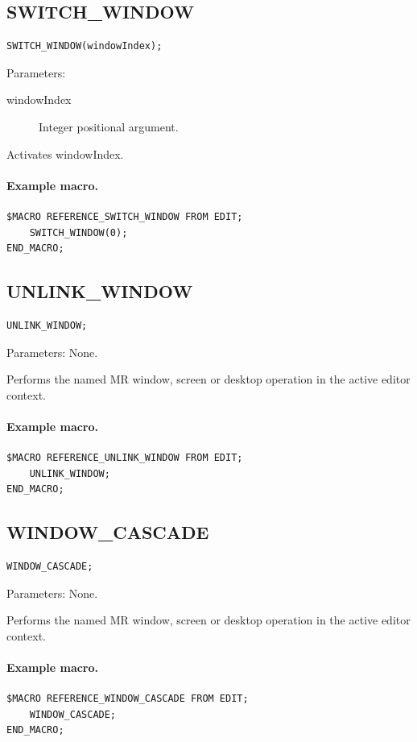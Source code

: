 \documentclass[a4paper,10pt,twoside,openany]{book}
\newenvironment{mrmacextension}{\begin{changebar}}{\end{changebar}}
\begin{document}
\label{prim:procedure-switch-window}
\subsection*{SWITCH\_WINDOW}
\begin{verbatim}
SWITCH_WINDOW(windowIndex);
\end{verbatim}
Parameters:
\begin{description}
\item[windowIndex] Integer positional argument.
\end{description}

Activates windowIndex.

\paragraph{Example macro.}
\begin{verbatim}
$MACRO REFERENCE_SWITCH_WINDOW FROM EDIT;
    SWITCH_WINDOW(0);
END_MACRO;
\end{verbatim}

\label{prim:procedure-unlink-window}
\subsection*{UNLINK\_WINDOW}
\begin{verbatim}
UNLINK_WINDOW;
\end{verbatim}
Parameters: None.

Performs the named MR window, screen or desktop operation in the active editor context.

\paragraph{Example macro.}
\begin{verbatim}
$MACRO REFERENCE_UNLINK_WINDOW FROM EDIT;
    UNLINK_WINDOW;
END_MACRO;
\end{verbatim}

\begin{mrmacextension}
\label{prim:procedure-window-cascade}
\subsection*{WINDOW\_CASCADE}
\begin{verbatim}
WINDOW_CASCADE;
\end{verbatim}
Parameters: None.

Performs the named MR window, screen or desktop operation in the active editor context.

\paragraph{Example macro.}
\begin{verbatim}
$MACRO REFERENCE_WINDOW_CASCADE FROM EDIT;
    WINDOW_CASCADE;
END_MACRO;
\end{verbatim}
\end{mrmacextension}
\end{document}
